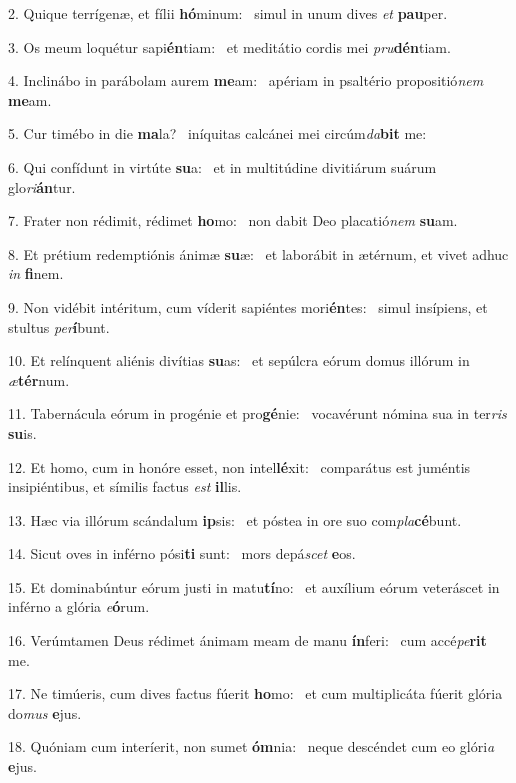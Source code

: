 2. Quique terrígenæ, et fílii \textbf{hó}minum: \ast\  simul in unum dives \textit{et} \textbf{pau}per.\

3. Os meum loquétur sapi\textbf{én}tiam: \ast\  et meditátio cordis mei \textit{pru}\textbf{dén}tiam.\

4. Inclinábo in parábolam aurem \textbf{me}am: \ast\  apériam in psaltério propositió\textit{nem} \textbf{me}am.\

5. Cur timébo in die \textbf{ma}la? \ast\  iníquitas calcánei mei circúm\textit{da}\textbf{bit} me:\

6. Qui confídunt in virtúte \textbf{su}a: \ast\  et in multitúdine divitiárum suárum glo\textit{ri}\textbf{án}tur.\

7. Frater non rédimit, rédimet \textbf{ho}mo: \ast\  non dabit Deo placatió\textit{nem} \textbf{su}am.\

8. Et prétium redemptiónis ánimæ \textbf{su}æ: \ast\  et laborábit in ætérnum, et vivet adhuc \textit{in} \textbf{fi}nem.\

9. Non vidébit intéritum, cum víderit sapiéntes mori\textbf{én}tes: \ast\  simul insípiens, et stultus \textit{per}\textbf{í}bunt.\

10. Et relínquent aliénis divítias \textbf{su}as: \ast\  et sepúlcra eórum domus illórum in \textit{æ}\textbf{tér}num.\

11. Tabernácula eórum in progénie et pro\textbf{gé}nie: \ast\  vocavérunt nómina sua in ter\textit{ris} \textbf{su}is.\

12. Et homo, cum in honóre esset, non intel\textbf{lé}xit: \ast\  comparátus est juméntis insipiéntibus, et símilis factus \textit{est} \textbf{il}lis.\

13. Hæc via illórum scándalum \textbf{ip}sis: \ast\  et póstea in ore suo com\textit{pla}\textbf{cé}bunt.\

14. Sicut oves in inférno pósi\textbf{ti} sunt: \ast\  mors depá\textit{scet} \textbf{e}os.\

15. Et dominabúntur eórum justi in matu\textbf{tí}no: \ast\  et auxílium eórum veteráscet in inférno a glória \textit{e}\textbf{ó}rum.\

16. Verúmtamen Deus rédimet ánimam meam de manu \textbf{ín}feri: \ast\  cum accé\textit{pe}\textbf{rit} me.\

17. Ne timúeris, cum dives factus fúerit \textbf{ho}mo: \ast\  et cum multiplicáta fúerit glória do\textit{mus} \textbf{e}jus.\

18. Quóniam cum interíerit, non sumet \textbf{óm}nia: \ast\  neque descéndet cum eo glóri\textit{a} \textbf{e}jus.\

